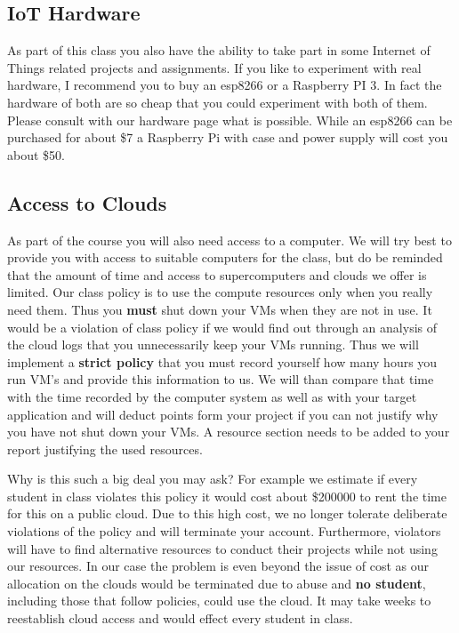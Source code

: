 \subsection{IoT Hardware}\label{iot-hardware}

As part of this class you also have the ability to take part in some
Internet of Things related projects and assignments. If you like to
experiment with real hardware, I recommend you to buy an esp8266 or a
Raspberry PI 3. In fact the hardware of both are so cheap that you could
experiment with both of them. Please consult with our hardware page what
is possible. While an esp8266 can be purchased for about \$7 a Raspberry
Pi with case and power supply will cost you about \$50.

\subsection{Access to Clouds}\label{access-to-clouds}

As part of the course you will also need access to a computer. We will
try best to provide you with access to suitable computers for the class,
but do be reminded that the amount of time and access to supercomputers
and clouds we offer is limited. Our class policy is to use the compute
resources only when you really need them. Thus you \textbf{must} shut
down your VMs when they are not in use. It would be a violation of class
policy if we would find out through an analysis of the cloud logs that
you unnecessarily keep your VMs running. Thus we will implement a
\textbf{strict policy} that you must record yourself how many hours you
run VM's and provide this information to us. We will than compare that
time with the time recorded by the computer system as well as with your
target application and will deduct points form your project if you can
not justify why you have not shut down your VMs. A resource section
needs to be added to your report justifying the used resources.

Why is this such a big deal you may ask? For example we estimate if
every student in class violates this policy it would cost about \$200000
to rent the time for this on a public cloud. Due to this high cost, we
no longer tolerate deliberate violations of the policy and will
terminate your account. Furthermore, violators will have to find
alternative resources to conduct their projects while not using our
resources. In our case the problem is even beyond the issue of cost as
our allocation on the clouds would be terminated due to abuse and
\textbf{no student}, including those that follow policies, could use the
cloud. It may take weeks to reestablish cloud access and would effect
every student in class.

